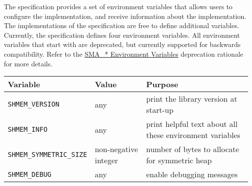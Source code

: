 The \openshmem specification provides a set of environment variables that allows
users to configure the \openshmem implementation, and receive information about
the implementation. The implementations of the specification are free to define
additional variables. Currently, the specification defines four environment
variables. All environment variables that start with  are
deprecated, but currently supported for backwards compatibility. Refer to the
\hyperref[subsec:deprecate-sma-env]{SMA\_* Environment Variables} deprecation
rationale for more details.

\medskip{}

\begin{tabular}{|l|l|l|}
\hline 
Variable & Value & Purpose\tabularnewline
\hline 
\hline 
\texttt{SHMEM\_VERSION} & any & print the library version at
start-up\tabularnewline
\hline 
\texttt{SHMEM\_INFO} & any & print helpful text about all these environment
variables\tabularnewline
\hline 
\texttt{SHMEM\_SYMMETRIC\_SIZE} & non-negative integer & number of bytes to
allocate for symmetric heap\tabularnewline
\hline 
\texttt{SHMEM\_DEBUG} & any & enable debugging messages\tabularnewline
\hline 
\end{tabular}

\medskip{}
